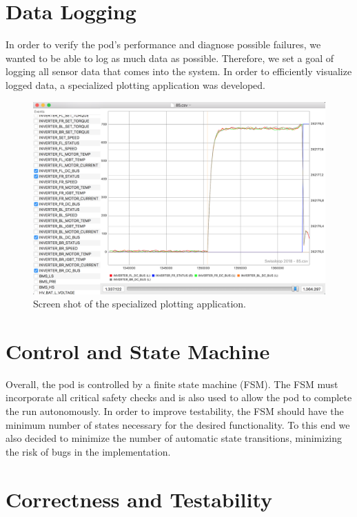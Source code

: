 \section{Data Logging}

In order to verify the pod's performance and diagnose possible failures, we wanted to be able to log as much data as possible. Therefore, we set a goal of logging all sensor data that comes into the system. In order to efficiently visualize logged data, a specialized plotting application was developed.

\begin{figure}[H]
  \centering \includegraphics[width=1.0\textwidth]{./figures/Screen_Shot_Plot.png}
  \caption{Screen shot of the specialized plotting application.}
\end{figure}

\section{Control and State Machine}

Overall, the pod is controlled by a finite state machine (FSM). The FSM must incorporate all critical safety checks and is also used to allow the pod to complete the run autonomously. In order to improve testability, the FSM should have the minimum number of states necessary for the desired functionality. To this end we also decided to minimize the number of automatic state transitions, minimizing the risk of bugs in the implementation.

\section{Correctness and Testability}

